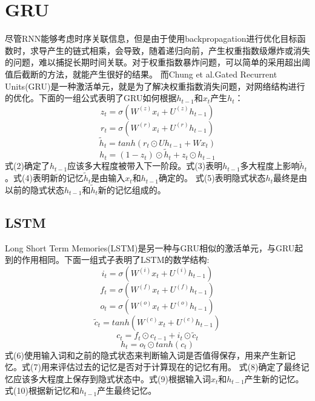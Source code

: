 \section{GRU}
尽管RNN能够考虑时序关联信息，但是由于使用backpropagation进行优化目标函数时，求导产生的链式相乘，会导致，随着递归向前，产生权重指数级爆炸或消失的问题，难以捕捉长期时间关联。对于权重指数暴炸问题，可以简单的采用超出阈值后截断的方法，就能产生很好的结果。
而Chung et al.\cite{chung2015gated}Gated Recurrent Units(GRU)是一种激活单元，就是为了解决权重指数消失问题，对网络结构进行的优化。下面的一组公式表明了GRU如何根据$h_{t-1}$和$x_t$产生$h_{t}$：\\
\begin{equation}
z_t = \sigma (W^{(z)}x_i + U^{(z)}h_{t-1})
\end{equation}
\begin{equation}
r_t = \sigma (W^{(r)}x_i + U^{(r)}h_{t-1})
\end{equation}
\begin{equation}
\widetilde{h}_t = tanh(r_t \odot Uh_{t-1} + Wx_t)
\end{equation}
\begin{equation}
h_t = (1-z_t) \odot \widetilde{h}_t + z_t \odot h_{t-1}
\end{equation}
式(2)确定了$h_{t-1}$应该多大程度被带入下一阶段。式(3)表明$h_{t-1}$多大程度上影响$\widetilde{h}_t$。式(4)表明新的记忆$\widetilde{h}_t$是由输入$x_t$和$h_{t-1}$确定的。
式(5)表明隐式状态$h_t$最终是由以前的隐式状态$h_{t-1}$和$\widetilde{h}_t$新的记忆组成的。
\subsection{LSTM}
Long Short Term Memories(LSTM)\cite{hochreiter1997long}是另一种与GRU相似的激活单元，与GRU起到的作用相同。下面一组式子表明了LSTM的数学结构:\\
\begin{equation}
i_t = \sigma (W^{(i)}x_t + U^{(i)}h_{t-1})
\end{equation}
\begin{equation}
f_t = \sigma (W^{(f)}x_t + U^{(f)}h_{t-1})
\end{equation}
\begin{equation}
o_t = \sigma (W^{(o)}x_t + U^{(o)}h_{t-1})
\end{equation}
\begin{equation}
\widetilde{c}_t = tanh(W^{(c)}x_t + U^{(c)}h_{t-1})
\end{equation}
\begin{equation}
c_t = f_t \odot c_{t-1} + i_t \odot \widetilde{c}_t
\end{equation}
\begin{equation}
h_t = o_t \odot tanh(c_t)
\end{equation}
式(6)使用输入词和之前的隐式状态来判断输入词是否值得保存，用来产生新记忆。式(7)用来评估过去的记忆是否对于计算现在的记忆有用。
式(8)确定了最终记忆应该多大程度上保存到隐式状态中。式(9)根据输入词$x_t$和$h_{t-1}$产生新的记忆。式(10)根据新记忆和$h_{t-1}$产生最终记忆。
